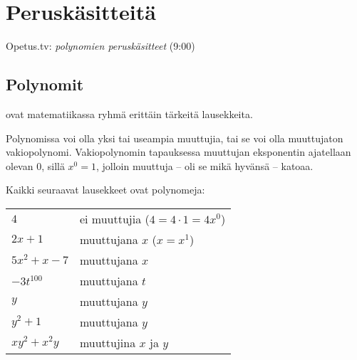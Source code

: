 \section{Peruskäsitteitä}

{Opetus.tv: \emph{polynomien peruskäsitteet} (9:00)}

\subsection*{Polynomit}

 ovat matematiikassa ryhmä erittäin tärkeitä lausekkeita.



Polynomissa voi olla yksi tai useampia muuttujia, tai se voi olla muuttujaton vakiopolynomi. Vakiopolynomin tapauksessa muuttujan eksponentin ajatellaan olevan $0$, sillä $x^0=1$, jolloin muuttuja -- oli se mikä hyvänsä -- katoaa.

\begin{esimerkki}
Kaikki seuraavat lausekkeet ovat polynomeja:

\begin{tabular}{ll}
$4$ &  ei muuttujia ($4=4\cdot 1 = 4x^0$)\\
$2x+1$ &  muuttujana $x$ ($x=x^1$)\\
$5x^2+x-7$ &   muuttujana $x$\\
$-3t^{100}$& muuttujana $t$\\
$y$& muuttujana $y$\\
$y^2+1$& muuttujana $y$\\
$xy^2+x^2y$& muuttujina $x$ ja $y$
\end{tabular}

\end{esimerkki}

